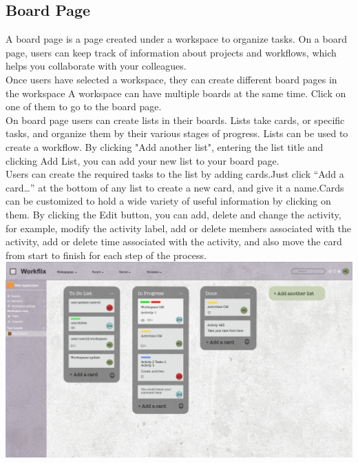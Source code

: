 \subsection{Board Page}

A board page is a page created under a workspace to organize tasks. On a board page, users can keep track of information
about projects and workflows, which helps you collaborate with your colleagues.\\

Once users have selected a workspace, they can create different board pages in the workspace A workspace can have multiple
boards at the same time. Click on one of them to go to the board page.\\

On board page users can create lists in their boards. Lists take cards, or specific tasks, and organize them by their
various stages of progress. Lists can be used to create a workflow. By clicking "Add another list", entering the list
title and clicking Add List, you can add your new list to your board page.\\

Users can create the required tasks to the list by adding cards.Just click “Add a card…” at the bottom of any list to create
a new card, and give it a name.Cards can be customized to hold a wide variety of useful information by clicking on them. By
clicking the Edit button, you can add, delete and change the activity, for example, modify the activity label, add or delete
members associated with the activity, add or delete time associated with the activity, and also move the card from start to
finish for each step of the process.
\includegraphics[width=\columnwidth]{images/Board.jpg}
